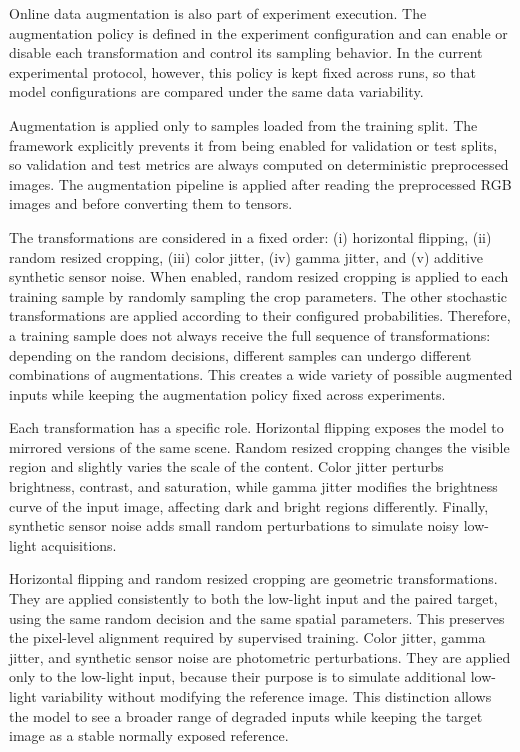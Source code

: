 Online data augmentation is also part of experiment execution. The augmentation policy is defined in the experiment configuration and can enable or disable each transformation and control its sampling behavior. In the current experimental protocol, however, this policy is kept fixed across runs, so that model configurations are compared under the same data variability.

Augmentation is applied only to samples loaded from the training split. The framework explicitly prevents it from being enabled for validation or test splits, so validation and test metrics are always computed on deterministic preprocessed images. The augmentation pipeline is applied after reading the preprocessed RGB images and before converting them to tensors.

The transformations are considered in a fixed order: (i) horizontal flipping, (ii) random resized cropping, (iii) color jitter, (iv) gamma jitter, and (v) additive synthetic sensor noise. When enabled, random resized cropping is applied to each training sample by randomly sampling the crop parameters. The other stochastic transformations are applied according to their configured probabilities. Therefore, a training sample does not always receive the full sequence of transformations: depending on the random decisions, different samples can undergo different combinations of augmentations. This creates a wide variety of possible augmented inputs while keeping the augmentation policy fixed across experiments.

Each transformation has a specific role. Horizontal flipping exposes the model to mirrored versions of the same scene. Random resized cropping changes the visible region and slightly varies the scale of the content. Color jitter perturbs brightness, contrast, and saturation, while gamma jitter modifies the brightness curve of the input image, affecting dark and bright regions differently. Finally, synthetic sensor noise adds small random perturbations to simulate noisy low-light acquisitions.

Horizontal flipping and random resized cropping are geometric transformations. They are applied consistently to both the low-light input and the paired target, using the same random decision and the same spatial parameters. This preserves the pixel-level alignment required by supervised training. Color jitter, gamma jitter, and synthetic sensor noise are photometric perturbations. They are applied only to the low-light input, because their purpose is to simulate additional low-light variability without modifying the reference image. This distinction allows the model to see a broader range of degraded inputs while keeping the target image as a stable normally exposed reference.

